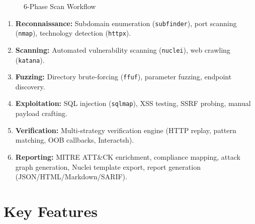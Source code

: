 \documentclass[12pt,a4paper]{article}
\begin{document}
\begin{figure}[H]
\centering
{}
\caption{6-Phase Scan Workflow}
\label{fig:workflow}
\end{figure}

\begin{enumerate}
    \item \textbf{Reconnaissance:} Subdomain enumeration (\texttt{subfinder}),
          port scanning (\texttt{nmap}), technology detection (\texttt{httpx}).
    \item \textbf{Scanning:} Automated vulnerability scanning (\texttt{nuclei}),
          web crawling (\texttt{katana}).
    \item \textbf{Fuzzing:} Directory brute-forcing (\texttt{ffuf}),
          parameter fuzzing, endpoint discovery.
    \item \textbf{Exploitation:} SQL injection (\texttt{sqlmap}), XSS testing,
          SSRF probing, manual payload crafting.
    \item \textbf{Verification:} Multi-strategy verification engine
          (HTTP replay, pattern matching, OOB callbacks, Interactsh).
    \item \textbf{Reporting:} MITRE ATT\&CK enrichment, compliance mapping,
          attack graph generation, Nuclei template export, report generation
          (JSON/HTML/Markdown/SARIF).
\end{enumerate}

\section{Key Features}
\end{document}
